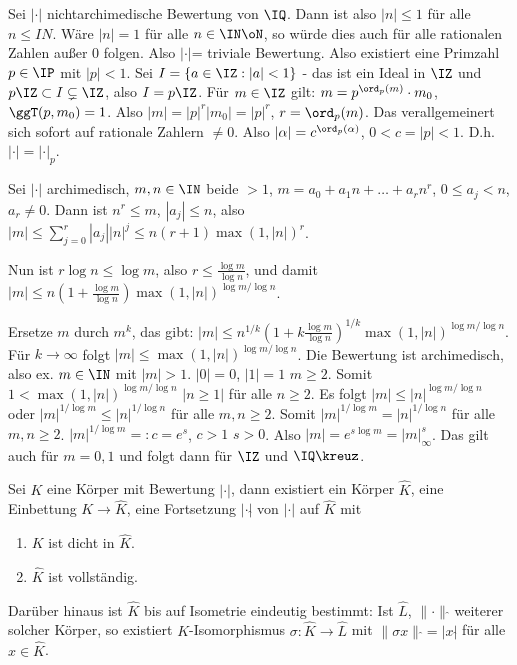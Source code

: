 \begin{Beweis}
 Sei $|\cdot|$ nichtarchimedische Bewertung von $\IQ$. Dann ist also $|n|\leq 1$ für alle $n\leq IN$. Wäre $|n|=1$ für alle $n\in\IN\oN$, so würde dies auch für alle rationalen Zahlen außer $0$ folgen. Also $|\cdot|$= triviale Bewertung. Also existiert eine Primzahl $p\in\IP$ mit $|p|<1$. Sei $I=\{a\in\IZ: |a|<1\}$ - das ist ein Ideal in $\IZ$ und $p\IZ\subset I\subsetneq \IZ$, also $I=p\IZ$. Für $m\in\IZ$ gilt: $m=p^{\ord_p(m)}\cdot m_0$, $\ggT(p,m_0)=1$. Also $|m|=|p|^r|m_0|=|p|^r$, $r=\ord_p(m)$. Das verallgemeinert sich sofort auf rationale Zahlern $\neq 0$. Also $|\alpha|=c^{\ord_p(\alpha)}$, $0<c=|p|<1$. D.h. $|\cdot|=|\cdot|_p$.
 
 Sei $|\cdot|$ archimedisch, $m,n\in\IN$ beide $>1$, $m=a_0+a_1n+\ldots+a_rn^r$, $0\leq a_j<n$, $a_r\neq 0$. Dann ist $n^r\leq m$, $|a_j|\leq n$, also $|m|\leq \sum_{j=0}^r|a_j||n|^j\leq n(r+1)\max(1,|n|)^r$.
 
 Nun ist $r\log n\leq \log m$, also $r\leq \frac{\log m}{\log n}$, und damit $|m|\leq n(1+\frac{\log m}{\log n})\max(1,|n|)^{\log m/\log n}$.
 
 Ersetze $m$ durch $m^k$, das gibt: $|m|\leq n^{1/k}(1+k\frac{\log m}{\log n})^{1/k} \max(1,|n|)^{\log m/\log n}$. Für $k\rightarrow\infty$ folgt $|m|\leq \max(1,|n|)^{\log m/\log n}$. Die Bewertung ist archimedisch, also ex. $m\in \IN$ mit $|m|>1$. $|0|=0$, $|1|=1$ \folge $m\geq 2$. Somit $1<\max(1,|n|)^{\log m/\log n}$ \folge $|n\geq 1|$ für alle $n\geq 2$. Es folgt $|m|\leq |n|^{\log m/\log n}$ oder $|m|^{1/\log m}\leq |n|^{1/\log n}$ für alle $m,n\geq 2$. Somit $|m|^{1/\log m}=|n|^{1/\log n}$ für alle $m,n\geq 2$. $|m|^{1/\log m}=:c=e^s$, $c>1$ \folge $s>0$. Also $|m|=e^{s\log m}=|m|_\infty^s$. Das gilt auch für $m=0,1$ und folgt dann für $\IZ$ und $\IQ\kreuz$.
\end{Beweis}

\begin{Fakt}
Sei $K$ eine Körper mit Bewertung $|\cdot|$, dann existiert ein Körper $\hat K$, eine Einbettung $K\rightarrow \hat K$, eine Fortsetzung $|\cdot|\hat{}$ von $|\cdot|$ auf $\hat K$ mit 
\begin{enumerate}
 \item $K$ ist dicht in $\hat K$.
 \item $\hat K$ ist vollständig.
\end{enumerate}
Darüber hinaus ist $\hat K$ bis auf Isometrie eindeutig bestimmt: Ist $\hat L$, $\|\cdot\|\hat{}$ weiterer solcher Körper, so existiert $K$-Isomorphismus $\sigma: \hat K\rightarrow \hat L$ mit $\|\sigma x\|\hat{}=|x|\hat{}$ für alle $x\in \hat K$.
\end{Fakt}
